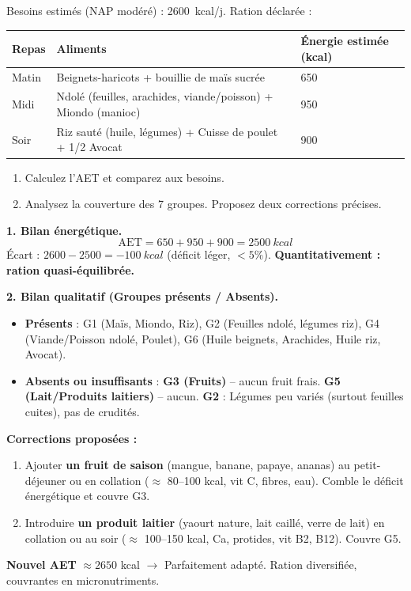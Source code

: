 \documentclass[11pt]{article}
\begin{document}
\begin{exoresolu}
Besoins estimés (NAP modéré) : \SI{2600}{kcal/j}. Ration déclarée :
\begin{center}
\begin{tabularx}{\linewidth}{|l|X|l|}\hline
\rowcolor{popblueL} \textbf{Repas} & \textbf{Aliments} & \textbf{Énergie estimée (kcal)} \\ \hline
Matin & Beignets-haricots + bouillie de maïs sucrée & 650 \\ \hline
Midi & Ndolé (feuilles, arachides, viande/poisson) + Miondo (manioc) & 950 \\ \hline
Soir & Riz sauté (huile, légumes) + Cuisse de poulet + 1/2 Avocat & 900 \\ \hline
\end{tabularx}
\end{center}
\begin{enumerate}
\item Calculez l'AET et comparez aux besoins.
\item Analysez la couverture des 7 groupes. Proposez deux corrections précises.
\end{enumerate}
\tcblower
\textbf{1. Bilan énergétique.}
\[ \text{AET} = 650 + 950 + 900 = \SI{2500}{kcal} \]
Écart : $2600 - 2500 = \SI{-100}{kcal}$ (déficit léger, $< 5\%$). \textbf{Quantitativement : ration quasi-équilibrée.}

\textbf{2. Bilan qualitatif (Groupes présents / Absents).}
\begin{itemize}
\item \textbf{Présents} : G1 (Maïs, Miondo, Riz), G2 (Feuilles ndolé, légumes riz), G4 (Viande/Poisson ndolé, Poulet), G6 (Huile beignets, Arachides, Huile riz, Avocat).
\item \textbf{Absents ou insuffisants} : \textbf{G3 (Fruits)} -- aucun fruit frais. \textbf{G5 (Lait/Produits laitiers)} -- aucun. \textbf{G2} : Légumes peu variés (surtout feuilles cuites), pas de crudités.
\end{itemize}

\textbf{Corrections proposées :}
\begin{enumerate}
\item Ajouter \textbf{un fruit de saison} (mangue, banane, papaye, ananas) au petit-déjeuner ou en collation ($\approx$ 80--100 kcal, vit C, fibres, eau). Comble le déficit énergétique et couvre G3.
\item Introduire \textbf{un produit laitier} (yaourt nature, lait caillé, verre de lait) en collation ou au soir ($\approx$ 100--150 kcal, Ca, protides, vit B2, B12). Couvre G5.
\end{enumerate}
\textbf{Nouvel AET} $\approx 2650$ kcal $\rightarrow$ Parfaitement adapté. Ration diversifiée, couvrantes en micronutriments.
\end{exoresolu}
\end{document}
